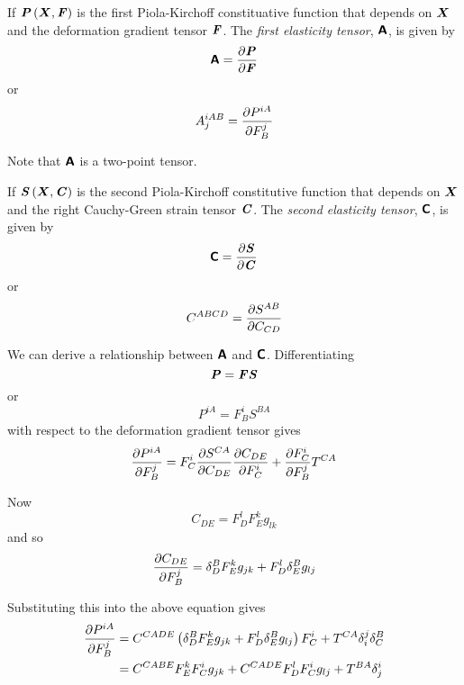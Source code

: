 If $ \boldsymbol{\mathit{P}}\left( \boldsymbol{X},\boldsymbol{\mathit{F}} \right) $ is the first Piola-Kirchoff
constituative function that depends on $\boldsymbol{X}$ and the deformation
gradient tensor $\boldsymbol{\mathit{F}}$. The \emph{first elasticity tensor},
$\boldsymbol{\mathsf{A}}$, is given by 
\begin{equation}
  \boldsymbol{\mathsf{A}}= \dfrac{\partial \boldsymbol{\mathit{P}}}{\partial \boldsymbol{\mathit{F}}} 
\end{equation}
or
\begin{equation}
  A^{iAB}_{j}= \dfrac{\partial P^{iA}}{\partial F^{j}_{B}} 
\end{equation}

Note that $\boldsymbol{\mathsf{A}}$ is a two-point tensor. 

If $ \boldsymbol{\mathit{S}}\left( \boldsymbol{X},\boldsymbol{\mathit{C}} \right) $ is the second Piola-Kirchoff
constitutive function that depends on $\boldsymbol{X}$ and the right Cauchy-Green
strain tensor $\boldsymbol{\mathit{C}}$. The \emph{second elasticity tensor},
$\boldsymbol{\mathsf{C}}$, is given by 
\begin{equation}
  \boldsymbol{\mathsf{C}}= \dfrac{\partial \boldsymbol{\mathit{S}}}{\partial \boldsymbol{\mathit{C}}} 
\end{equation}
or
\begin{equation}
  C^{ABCD}= \dfrac{\partial S^{AB}}{\partial C_{CD}} 
\end{equation}

We can derive a relationship between $\boldsymbol{\mathsf{A}}$ and $\boldsymbol{\mathsf{C}}$. Differentiating
\begin{equation}
  \boldsymbol{\mathit{P}}=\boldsymbol{\mathit{F}}\boldsymbol{\mathit{S}}
\end{equation}
or
\begin{equation}
  P^{iA}=F^{i}_{B}S^{BA}
\end{equation}
with respect to the deformation gradient tensor gives
\begin{equation}
   \dfrac{\partial P^{iA}}{\partial F^{j}_{B}} =F^{i}_{C} \dfrac{\partial S^{CA}}{\partial C_{DE}}  \dfrac{\partial C_{DE}}{\partial F^{i}_{C}} + \dfrac{\partial F^{i}_{C}}{\partial F^{j}_{B}} T^{CA}
\end{equation}

Now
\begin{equation}
  C_{DE}=F^{l}_{D}F^{k}_{E}g_{lk}
\end{equation}
and so
\begin{equation}
   \dfrac{\partial C_{DE}}{\partial F^{j}_{B}} = \delta_{D}^{B} F^{k}_{E}g_{jk}+F^{l}_{D} \delta_{E}^{B} g_{lj}
\end{equation}

Substituting this into the above equation gives
\begin{equation}
  \begin{split}
     \dfrac{\partial P^{iA}}{\partial F^{j}_{B}} &=C^{CADE}\left(  \delta_{D}^{B} F^{k}_{E}g_{jk}+
      F^{l}_{D} \delta_{E}^{B} g_{lj} \right)F^{i}_{C}+T^{CA} \delta_{i}^{j}  \delta_{C}^{B} \\
    &=C^{CABE}F^{k}_{E}F^{i}_{C}g_{jk}+C^{CADE}F^{l}_{D}F^{i}_{C}g_{lj}+T^{BA} \delta_{j}^{i} 
  \end{split}
\end{equation}

